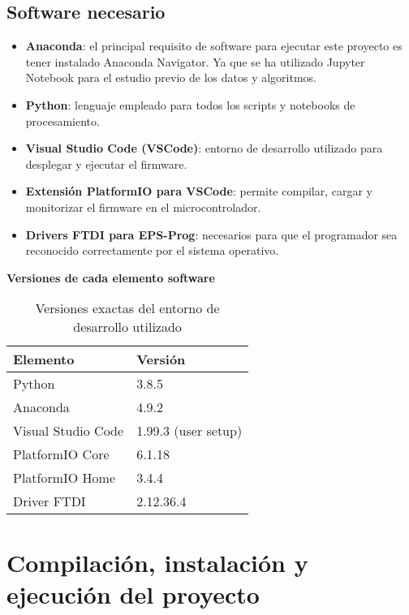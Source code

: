 \subsection{Software necesario}

\begin{itemize}
  \item \textbf{Anaconda}: el principal requisito de software para ejecutar este proyecto es tener instalado Anaconda Navigator. Ya que se ha utilizado Jupyter Notebook para el estudio previo de los datos y algoritmos.
  \item \textbf{Python}: lenguaje empleado para todos los scripts y notebooks de procesamiento.
  \item \textbf{Visual Studio Code (VSCode)}: entorno de desarrollo utilizado para desplegar y ejecutar el firmware.
  \item \textbf{Extensión PlatformIO para VSCode}: permite compilar, cargar y monitorizar el firmware en el microcontrolador.
  \item \textbf{Drivers FTDI para EPS-Prog}: necesarios para que el programador sea reconocido correctamente por el sistema operativo\footnotemark[1].
\end{itemize}



\textbf{Versiones de cada elemento software}

\begin{table}[H]
  \centering
  \begin{tabular}{|l|l|}
    \hline
    \textbf{Elemento} & \textbf{Versión} \\
    \hline
    Python & 3.8.5 \\
    Anaconda & 4.9.2 \\
    Visual Studio Code & 1.99.3 (user setup) \\
    PlatformIO Core & 6.1.18 \\
    PlatformIO Home & 3.4.4 \\
    Driver FTDI & 2.12.36.4 \\
    \hline
  \end{tabular}
  \caption{Versiones exactas del entorno de desarrollo utilizado}
  \label{tab:versiones_software}
\end{table}

\section{Compilación, instalación y ejecución del proyecto}

